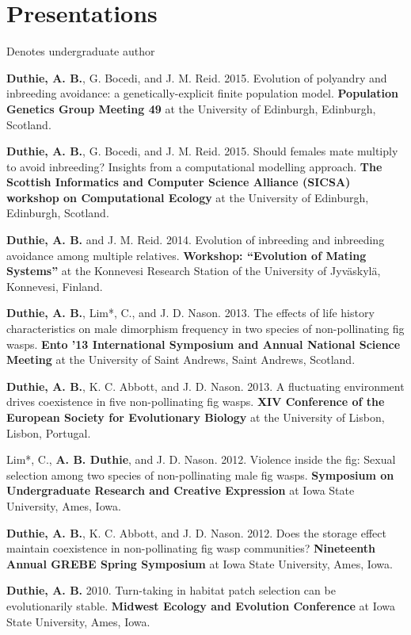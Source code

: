 \documentclass[letterpaper]{article}
\renewenvironment{itemize}{
  \begin{list}{}{
    \setlength{\leftmargin}{1.5em}
  }
}{
  \end{list}
}
\begin{document}
\section*{Presentations}
\begin{itemize}
\item *Denotes undergraduate author
\item {\bf Duthie, A. B.}, G. Bocedi, and J. M. Reid. 2015. Evolution of polyandry and inbreeding avoidance: a genetically-explicit finite population model. {\bf Population Genetics Group Meeting 49} at the University of Edinburgh, Edinburgh, Scotland.
\item {\bf Duthie, A. B.}, G. Bocedi, and J. M. Reid. 2015. Should females mate multiply to avoid inbreeding? Insights from a computational modelling approach. {\bf The Scottish Informatics and Computer Science Alliance (SICSA) workshop on Computational Ecology} at the University of Edinburgh, Edinburgh, Scotland.
\item {\bf Duthie, A. B.} and J. M. Reid. 2014. Evolution of inbreeding and inbreeding avoidance among multiple relatives. {\bf Workshop: ``Evolution of Mating Systems''} at the Konnevesi Research Station of the University of Jyv\"{a}skyl\"{a}, Konnevesi, Finland.
\item {\bf Duthie, A. B.}, Lim*, C., and J. D. Nason. 2013. The effects of life history characteristics on male dimorphism frequency in two species of non-pollinating fig wasps. {\bf Ento '13 International Symposium and Annual National Science Meeting} at the University of Saint Andrews, Saint Andrews, Scotland.
\item {\bf Duthie, A. B.}, K. C. Abbott, and J. D. Nason. 2013. A fluctuating environment drives coexistence in five non-pollinating fig wasps. {\bf XIV Conference of the European Society for Evolutionary Biology} at the University of Lisbon, Lisbon, Portugal.
\item Lim*, C., {\bf A. B. Duthie}, and J. D. Nason. 2012. Violence inside the fig: Sexual selection among two species of non-pollinating male fig wasps. {\bf Symposium on Undergraduate Research and Creative Expression} at Iowa State University, Ames, Iowa.
\item {\bf Duthie, A. B.}, K. C. Abbott, and J. D. Nason. 2012. Does the storage effect maintain coexistence in non-pollinating fig wasp communities? {\bf Nineteenth Annual GREBE Spring Symposium} at Iowa State University, Ames, Iowa.
\item {\bf Duthie, A. B.} 2010. Turn-taking in habitat patch selection can be evolutionarily stable. {\bf Midwest Ecology and Evolution Conference} at Iowa State University, Ames, Iowa.

\end{itemize}
\end{document}
